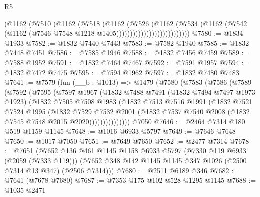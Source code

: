\begin{lexlean}{R5}
\begin{coremodule}
                                  (@1162
                                    (@7510
                                      (@1162
                                        (@7518
                                          (@1162
                                            (@7526
                                              (@1162
                                                (@7534
                                                  (@1162
                                                    (@7542
                                                      (@1162
                                                        (@7546
                                                          @7548
                                                          @1218
                                                          @1405)))))))))))))))))))))))))))
@7580 := @1834 @1933
@7582 := @1832 @7440 @7443
@7583 := @7582 @1940
@7585 := @1832 @7448 @7451
@7586 := @7585 @1946
@7588 := @1832 @7456 @7459
@7589 := @7588 @1952
@7591 := @1832 @7464 @7467
@7592 := @7591 @1957
@7594 := @1832 @7472 @7475
@7595 := @7594 @1962
@7597 := @1832 @7480 @7483
@7641 := @7579
    (fun (__b : @1013) =>
    @1479
      (@7580
        (@7583
          (@7586
            (@7589
              (@7592
                (@7595
                  (@7597
                    @1967
                    (@1832
                      @7488
                      @7491
                      (@1832 @7494 @7497 @1973 @1923)
                      (@1832
                        @7505
                        @7508
                        @1983
                        (@1832
                          @7513
                          @7516
                          @1991
                          (@1832
                            @7521
                            @7524
                            @1995
                            (@1832
                              @7529
                              @7532
                              @2001
                              (@1832 @7537 @7540 @2008 (@1832 @7545 @7548 @2015 @2020)))))))))))))))
    @7050
@7646 := @2464 @7314 @180 @519 @1159 @1145
@7648 := @1016 @6933 @5797
@7649 := @7646 @7648
@7650 := @1017 @7050
@7651 := @7649 @7650
@7652 := @2477 @7314
@7678 := @7651
    (@7652
      @136
      @461
      @1145
      @1158
      @6933
      @5797
      (@7330 @119 @6933 (@2059 (@7333 @119)))
      (@7652 @348 @142 @1145 @1145 @347 @1026 (@2500 @7314 @13 @347) (@2506 @7314)))
@7680 := @2511 @6189 @346
@7682 := @7641 (@7678 @7680)
@7687 := @7353 @175 @102 @528 @1295 @1145
@7688 := @1035 @2471

\end{coremodule}
\end{lexlean}
